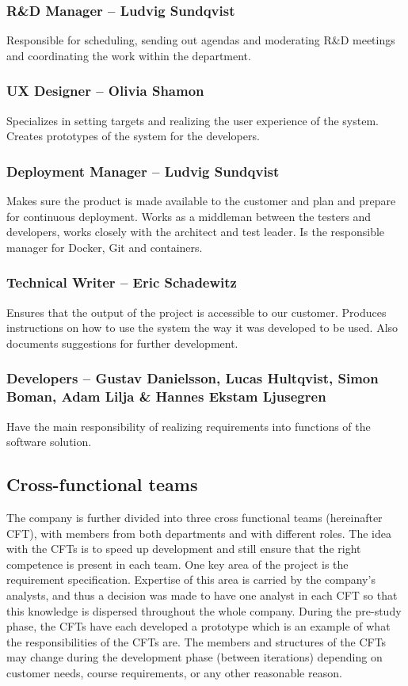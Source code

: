 \subsubsection*{R\&D Manager – Ludvig Sundqvist}
Responsible for scheduling, sending out agendas and moderating R\&D meetings and coordinating the work within the department.  

\subsubsection*{UX Designer – Olivia Shamon} 
Specializes in setting targets and realizing the user experience of the system. Creates prototypes of the system for the developers.  

\subsubsection*{Deployment Manager – Ludvig Sundqvist}
Makes sure the product is made available to the customer and plan and prepare for continuous deployment. Works as a middleman between the testers and developers, works closely with the architect and test leader. Is the responsible manager for Docker, Git and containers. 

\subsubsection*{Technical Writer – Eric Schadewitz} 
Ensures that the output of the project is accessible to our customer. Produces instructions on how to use the system the way it was developed to be used. Also documents suggestions for further development. 

\subsubsection*{Developers – Gustav Danielsson, Lucas Hultqvist, Simon Boman, Adam Lilja \& Hannes Ekstam Ljusegren} 
Have the main responsibility of realizing requirements into functions of the software solution. 

\subsection{Cross-functional teams}
\label{sec:companywide:subsection:cft}
The company is further divided into three cross functional teams (hereinafter CFT), with members from both departments and with different roles. The idea with the CFTs is to speed up development and still ensure that the right competence is present in each team. One key area of the project is the requirement specification. Expertise of this area is carried by the company's analysts, and thus a decision was made to have one analyst in each CFT so that this knowledge is dispersed throughout the whole company. During the pre-study phase, the CFTs have each developed a prototype which is an example of what the responsibilities of the CFTs are. The members and structures of the CFTs may change during the development phase (between iterations) depending on customer needs, course requirements, or any other reasonable reason. 

